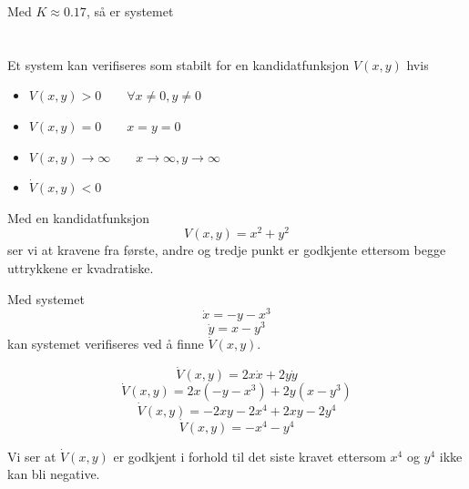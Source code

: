 \documentclass[norsk]{article}
\begin{document}
Med \(K \approx 0.17\), så er systemet 

\section{}
Et system kan verifiseres som stabilt for en kandidatfunksjon \(V(x,y)\) hvis
\begin{itemize}
\item \(V(x, y) > 0 \qquad \forall x \neq 0, y \neq 0\)
\item \(V(x,y) = 0 \qquad x = y = 0\)
\item \(V(x,y) \rightarrow \infty \qquad x \rightarrow \infty, y \rightarrow \infty\)
\item \(\dot{V}(x,y) < 0 \)
\end{itemize}
Med en kandidatfunksjon \[V(x,y) = x^2 +  y^2\] ser vi at kravene fra første, andre og tredje punkt er godkjente ettersom begge uttrykkene er kvadratiske.

Med systemet \[\dot{x} = -y-x^3\] \[\dot{y} = x - y^3\] kan systemet verifiseres ved å finne \(\dot{V}(x, y)\).

\[\dot{V}(x,y) = 2x\dot{x} + 2y\dot{y}\]
\[\dot{V}(x,y) = 2x(-y-x^3) + 2y(x-y^3)\]
\[\dot{V}(x,y)=-2xy-2x^4 + 2xy-2y^4\]
\[\dot{V}(x,y) = -x^4-y^4\]

Vi ser at \(\dot{V}(x,y)\) er godkjent i forhold til det siste kravet ettersom \(x^4\) og \(y^4\) ikke kan bli negative.



\section{}
\end{document}
